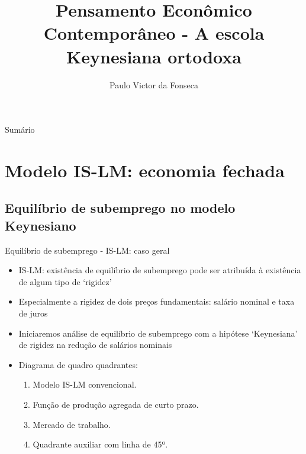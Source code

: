 \documentclass[10pt]{beamer}
\title[]{Pensamento Econômico Contemporâneo - A escola Keynesiana ortodoxa}
\author[]{Paulo Victor da Fonseca}
\date{}
\begin{document}
\begin{frame}[plain]
\end{frame}

\begin{frame}{Sumário}
    \tableofcontents
\end{frame}

\section{Modelo IS-LM: economia fechada}
\subsection{Equilíbrio de subemprego no modelo Keynesiano}
\begin{frame}{Equilíbrio de subemprego - IS-LM: caso geral}
    \begin{itemize}
        \item IS-LM: existência de equilíbrio de subemprego pode ser atribuída à existência de algum tipo de `rigidez'
        \bigskip
        \item Especialmente a rigidez de dois preços fundamentais: salário nominal e taxa de juros
        \bigskip
        \item Iniciaremos análise de equilíbrio de subemprego com a hipótese `Keynesiana' de rigidez na redução de salários nominais
        \bigskip
        \item Diagrama de quadro quadrantes:
        \bigskip
        \begin{enumerate}
            \item Modelo IS-LM convencional.
            \medskip
            \item Função de produção agregada de curto prazo.
            \medskip
            \item Mercado de trabalho.
            \medskip
            \item Quadrante auxiliar com linha de 45º.
        \end{enumerate}
    \end{itemize}
\end{frame}
\end{document}
